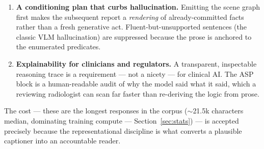 \documentclass[11pt,a4paper]{article}
\begin{document}
\begin{enumerate}[leftmargin=1.6em]
  \item \textbf{A conditioning plan that curbs hallucination.} Emitting the scene graph first makes the subsequent report a \emph{rendering} of already-committed facts rather than a fresh generative act. Fluent-but-unsupported sentences (the classic VLM hallucination) are suppressed because the prose is anchored to the enumerated predicates.
  \item \textbf{Explainability for clinicians and regulators.} A transparent, inspectable reasoning trace is a requirement --- not a nicety --- for clinical AI. The ASP block is a human-readable audit of why the model said what it said, which a reviewing radiologist can scan far faster than re-deriving the logic from prose.
\end{enumerate}
The cost --- these are the longest responses in the corpus ($\sim$21.5k characters median, dominating training compute --- Section~\ref{sec:stats}) --- is accepted precisely because the representational discipline is what converts a plausible captioner into an accountable reader.
\end{document}
